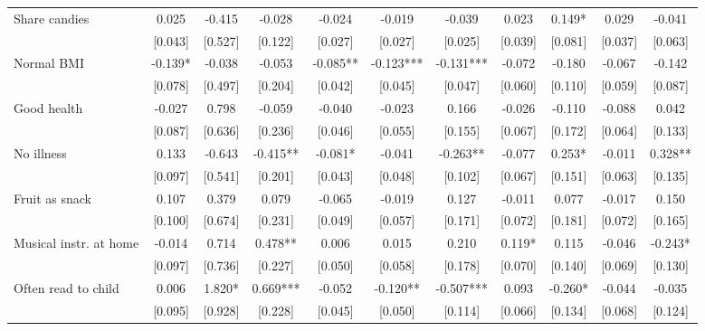 \documentclass[12pt]{article}
\begin{document}
\begin{table}[ht]
\begin{center}
\begin{adjustbox}{width=1.2\textwidth,center=\textwidth}
\begin{tabular}{l*{10}{c}}
Share candies & 0.025 & -0.415 & -0.028 & -0.024 & -0.019 & -0.039 & 0.023 & 0.149* & 0.029 & -0.041 \\
 & [0.043] & [0.527] & [0.122] & [0.027] & [0.027] & [0.025] & [0.039] & [0.081] & [0.037] & [0.063] \\
Normal BMI & -0.139* & -0.038 & -0.053 & -0.085** & -0.123*** & -0.131*** & -0.072 & -0.180 & -0.067 & -0.142 \\
 & [0.078] & [0.497] & [0.204] & [0.042] & [0.045] & [0.047] & [0.060] & [0.110] & [0.059] & [0.087] \\
Good health & -0.027 & 0.798 & -0.059 & -0.040 & -0.023 & 0.166 & -0.026 & -0.110 & -0.088 & 0.042 \\
 & [0.087] & [0.636] & [0.236] & [0.046] & [0.055] & [0.155] & [0.067] & [0.172] & [0.064] & [0.133] \\
No illness & 0.133 & -0.643 & -0.415** & -0.081* & -0.041 & -0.263** & -0.077 & 0.253* & -0.011 & 0.328** \\
 & [0.097] & [0.541] & [0.201] & [0.043] & [0.048] & [0.102] & [0.067] & [0.151] & [0.063] & [0.135] \\
Fruit as snack & 0.107 & 0.379 & 0.079 & -0.065 & -0.019 & 0.127 & -0.011 & 0.077 & -0.017 & 0.150 \\
 & [0.100] & [0.674] & [0.231] & [0.049] & [0.057] & [0.171] & [0.072] & [0.181] & [0.072] & [0.165] \\
Musical instr. at home & -0.014 & 0.714 & 0.478** & 0.006 & 0.015 & 0.210 & 0.119* & 0.115 & -0.046 & -0.243* \\
 & [0.097] & [0.736] & [0.227] & [0.050] & [0.058] & [0.178] & [0.070] & [0.140] & [0.069] & [0.130] \\
Often read to child
 & 0.006 & 1.820* & 0.669*** & -0.052 & -0.120** & -0.507*** & 0.093 & -0.260* & -0.044 & -0.035 \\
 & [0.095] & [0.928] & [0.228] & [0.045] & [0.050] & [0.114] & [0.066] & [0.134] & [0.068] & [0.124] \\

\end{tabular}
\end{adjustbox}
\end{center}
\end{table}
\end{document}
